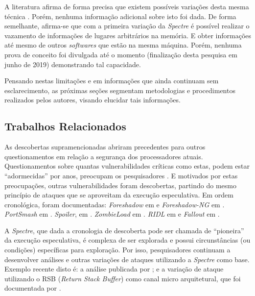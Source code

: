 \documentclass[
	article,			    %
	12pt,				    %
	oneside,			    %
	a4paper,			    %
	chapter=TITLE,		    %
	section=TITLE,		    %
	subsection=TITLE,	    %
	english,			    %
	brazil,				    %
	sumario=tradicional
]{abntex2}
\begin{document}
A literatura afirma de forma precisa que existem possíveis variações desta mesma técnica \cite{Kocher2018Spectre}. Porém, nenhuma informação adicional sobre isto foi dada. De forma semelhante, afirma-se que com a primeira variação da \emph{Spectre} é possível realizar o vazamento de informações de lugares arbitrários na memória. E obter informações até mesmo de outros \emph{softwares} que estão na mesma máquina. Porém, nenhuma prova de conceito foi divulgada até o momento (finalização desta pesquisa em junho de 2019) demonstrando tal capacidade.

Pensando nestas limitações e em informações que ainda continuam sem esclarecimento, as próximas seções segmentam metodologias e procedimentos realizados pelos autores, visando elucidar tais informações.

\subsection{Trabalhos Relacionados}
As descobertas supramencionadas abriram precedentes para outros questionamentos em relação a segurança dos processadores atuais. Questionamentos sobre quantas vulnerabilidades críticas como estas, podem estar ``adormecidas'' por anos, preocupam os pesquisadores \cite{Andy2018Triple}. E motivados por estas preocupações, outras vulnerabilidades foram descobertas, partindo do mesmo princípio de ataques que se aproveitam da execução especulativa. Em ordem cronológica, foram documentadas: \emph{Foreshadow} em  e \emph{Foreshadow-NG} em . \emph{PortSmash} em . \emph{Spoiler}, em . \emph{ZombieLoad} em . \emph{RIDL} em  e \emph{Fallout} em .

A \emph{Spectre}, que dada a cronologia de descoberta pode ser chamada de ``pioneira'' da execução especulativa, é complexa de ser explorada e possui circunstâncias (ou condições) específicas para exploração. Por isso, pesquisadores continuam a desenvolver análises e outras variações de ataques utilizando a \emph{Spectre} como base. Exemplo recente disto é: a análise publicada por ; e a variação de ataque utilizando o RSB (\emph{Return Stack Buffer}) como canal micro arquitetural, que foi documentada por .
\end{document}
